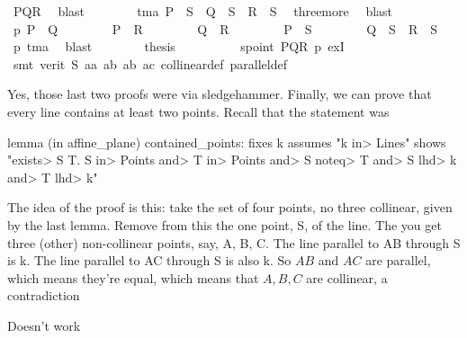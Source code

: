 \begin{isabellebody}
\ PQR\ \isamarkupfalse%
\ blast\isanewline
\ \ \ \ \ \ \isamarkupfalse%
\ tma{\isacharcolon}{\kern0pt}\ {\isachardoublequoteopen}P\ {\isasymnoteq}\ S\ {\isasymand}\ Q\ {\isasymnoteq}\ S\ {\isasymand}\ R\ {\isasymnoteq}\ S{\isachardoublequoteclose}\ \isamarkupfalse%
\ three{\isacharunderscore}{\kern0pt}more\ \isamarkupfalse%
\ blast\isanewline
\ \ \ \ \ \ \isamarkupfalse%
\ p{}{\isacharcolon}{\kern0pt}\ {\isachardoublequoteopen}P\ {\isasymnoteq}\ Q\ {\isasymand}\isanewline
\ \ \ \ \ \ \ P\ {\isasymnoteq}\ R\ {\isasymand}\isanewline
\ \ \ \ \ \ \ Q\ {\isasymnoteq}\ R\ {\isasymand}\isanewline
\ \ \ \ \ \ \ P\ {\isasymnoteq}\ S\ {\isasymand}\isanewline
\ \ \ \ \ \ \ Q\ {\isasymnoteq}\ S\ {\isasymand}\ R\ {\isasymnoteq}\ S{\isachardoublequoteclose}\ \isamarkupfalse%
\ p{}\ tma\ \isamarkupfalse%
\ blast\isanewline
\ \ \ \ \ \ \isamarkupfalse%
\ {\isacharquery}{\kern0pt}thesis\isanewline
\ \ \ \ \ \ \ \ \isamarkupfalse%
\ spoint\ PQR\ p{}\ exI\ \isanewline
\ \ \ \ \ \ \isamarkupfalse%
\ {\isacharparenleft}{\kern0pt}smt\ {\isacharparenleft}{\kern0pt}verit{\isacharparenright}{\kern0pt}\ S\ a{}a\ a{}b\ a{}b\ a{}c\ collinear{\isacharunderscore}{\kern0pt}def\ parallel{\isacharunderscore}{\kern0pt}def{\isacharparenright}{\kern0pt}\isanewline
\ \ \isamarkupfalse%
%
\endisatagproof
{\isafoldproof}%
%
\isadelimproof
%
\endisadelimproof
%
\begin{isamarkuptext}%
Yes, those last two proofs were via sledgehammer. Finally, we can prove that every line contains 
at least two points. Recall that the statement was

lemma (in affine_plane) contained_points: 
  fixes k
  assumes "k \<in> Lines"
  shows "\<exists> S T. S \<in> Points \<and> T \<in> Points \<and>  S \<noteq> T \<and>  S \<lhd> k \<and>  T \<lhd> k"

The idea of the proof is this: take the set of four points, no three collinear, given by the last lemma.
Remove from this the one point, S, of the line. The you get three (other) non-collinear points, 
say, A, B, C. The line parallel to AB through S is k. The line parallel to AC through S is also k. So $AB$
and $AC$ are parallel, which means they're equal, which means that $A,B,C$ are collinear, a contradiction 

Doesn't work


\end{isamarkuptext}
\end{isabellebody}
